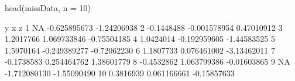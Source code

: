\begin{Schunk}
\begin{Sinput}
 head(missData, n = 10)
\end{Sinput}
\begin{Soutput}
            y            x           z
1          NA -0.625895673 -1.24206938
2  -0.1448488 -0.001578954  0.47010912
3   1.2017766  1.069733846 -0.75504185
4   1.0424014 -0.192959605 -1.44583525
5   1.5970164 -0.249389277 -0.72062230
6   1.1807733  0.076461002 -3.13462011
7  -0.1738583  0.254464762  1.38601779
8  -0.4532862  1.063799386 -0.01603865
9          NA -1.712080130 -1.55090490
10  0.3816939  0.061166661 -0.15857633
\end{Soutput}
\end{Schunk}
